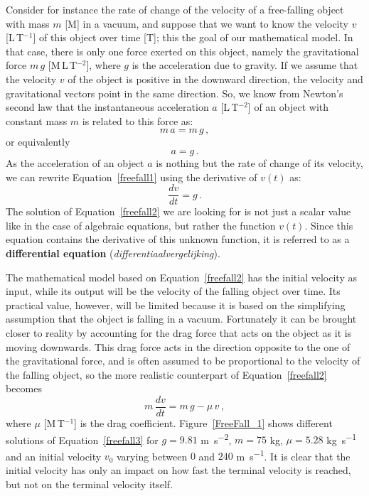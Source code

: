 Consider for instance the rate of change of the velocity of a free-falling object with mass $m$ [M] in a vacuum, and suppose that we want to know the velocity  $v$ [L\,T$^{-1}$] of this object over time [T]; this the goal of our mathematical model. In that case, there is only one force exerted on this object, namely the gravitational force $m\,g$ [M\,L\,T$^{-2}$], where $g$ is the acceleration due to gravity. If we assume that the velocity $v$ of the object is positive in the downward direction, the velocity and gravitational vectors point in the same direction. So, we know from Newton's second law that
the instantaneous acceleration $a$ [L\,T$^{-2}$] of an object with constant mass $m$ is related to this force as:
\begin{equation}
m\,a=m\,g\,,
\end{equation}
or equivalently
\begin{equation}
a=g\,.
\label{freefall1}
\end{equation}
As the acceleration of an object $a$ is nothing but the rate of change of its velocity, we can rewrite Equation~\eqref{freefall1} using the derivative of $v(t)$ as:
\begin{equation}
\dfrac{d v}{d t}=g\,.
\label{freefall2}
\end{equation}
The solution of Equation~\eqref{freefall2} we are looking for is not just a scalar value like in the case of algebraic equations, but rather the function $v(t)$. Since this equation contains the derivative of this unknown function, it is referred to as a \textbf{differential equation} (\textit{differentiaalvergelijking}). 

The mathematical model based on Equation~\eqref{freefall2} has the initial velocity as input, while its output will be the velocity of the falling object over time. Its practical value, however, will be limited because it is based on the simplifying assumption that the object is falling in a vacuum. Fortunately it can be brought closer to reality by accounting for the drag force that acts on the object as it is moving downwards. This drag force acts in the direction opposite to the one of the gravitational force, and is often assumed to be proportional to the velocity of the falling object, so the more realistic counterpart of Equation~\eqref{freefall2} becomes
\begin{equation}
m\,\dfrac{d v}{d t}=m\,g-\mu\,v\,,
\label{freefall3}
\end{equation}
where $\mu$ [M\,T$^{-1}$] is the drag coefficient. Figure~\ref{FreeFall_1} shows different solutions of Equation~\eqref{freefall3} for $g=9.81$ \si{m.s^{-2}}, $m=75$ \si{kg}, $\mu=5.28$ \si{kg.s^{-1}}  and an initial velocity $v_0$ varying between $0$ and $240$ \si{m.s^{-1}}. It is clear that the initial velocity has only an impact on how fast the terminal velocity is reached, but not on the terminal velocity itself. 

